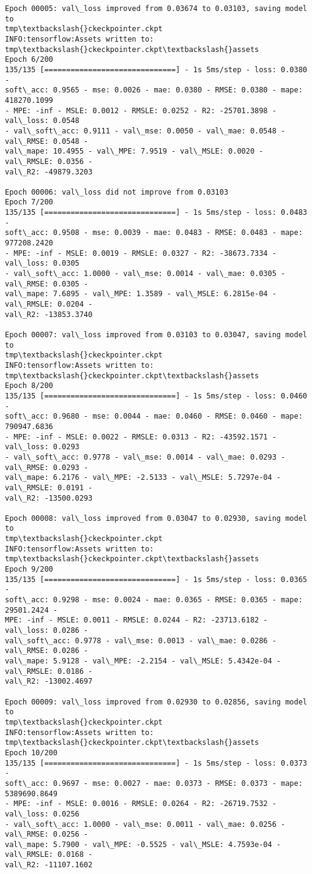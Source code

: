 \documentclass[11pt]{article}
\begin{document}
\begin{Verbatim}[commandchars=\\\{\}]
Epoch 00005: val\_loss improved from 0.03674 to 0.03103, saving model to
tmp\textbackslash{}ckeckpointer.ckpt
INFO:tensorflow:Assets written to: tmp\textbackslash{}ckeckpointer.ckpt\textbackslash{}assets
Epoch 6/200
135/135 [==============================] - 1s 5ms/step - loss: 0.0380 -
soft\_acc: 0.9565 - mse: 0.0026 - mae: 0.0380 - RMSE: 0.0380 - mape: 418270.1099
- MPE: -inf - MSLE: 0.0012 - RMSLE: 0.0252 - R2: -25701.3898 - val\_loss: 0.0548
- val\_soft\_acc: 0.9111 - val\_mse: 0.0050 - val\_mae: 0.0548 - val\_RMSE: 0.0548 -
val\_mape: 10.4955 - val\_MPE: 7.9519 - val\_MSLE: 0.0020 - val\_RMSLE: 0.0356 -
val\_R2: -49879.3203

Epoch 00006: val\_loss did not improve from 0.03103
Epoch 7/200
135/135 [==============================] - 1s 5ms/step - loss: 0.0483 -
soft\_acc: 0.9508 - mse: 0.0039 - mae: 0.0483 - RMSE: 0.0483 - mape: 977208.2420
- MPE: -inf - MSLE: 0.0019 - RMSLE: 0.0327 - R2: -38673.7334 - val\_loss: 0.0305
- val\_soft\_acc: 1.0000 - val\_mse: 0.0014 - val\_mae: 0.0305 - val\_RMSE: 0.0305 -
val\_mape: 7.6895 - val\_MPE: 1.3589 - val\_MSLE: 6.2815e-04 - val\_RMSLE: 0.0204 -
val\_R2: -13853.3740

Epoch 00007: val\_loss improved from 0.03103 to 0.03047, saving model to
tmp\textbackslash{}ckeckpointer.ckpt
INFO:tensorflow:Assets written to: tmp\textbackslash{}ckeckpointer.ckpt\textbackslash{}assets
Epoch 8/200
135/135 [==============================] - 1s 5ms/step - loss: 0.0460 -
soft\_acc: 0.9680 - mse: 0.0044 - mae: 0.0460 - RMSE: 0.0460 - mape: 790947.6836
- MPE: -inf - MSLE: 0.0022 - RMSLE: 0.0313 - R2: -43592.1571 - val\_loss: 0.0293
- val\_soft\_acc: 0.9778 - val\_mse: 0.0014 - val\_mae: 0.0293 - val\_RMSE: 0.0293 -
val\_mape: 6.2176 - val\_MPE: -2.5133 - val\_MSLE: 5.7297e-04 - val\_RMSLE: 0.0191 -
val\_R2: -13500.0293

Epoch 00008: val\_loss improved from 0.03047 to 0.02930, saving model to
tmp\textbackslash{}ckeckpointer.ckpt
INFO:tensorflow:Assets written to: tmp\textbackslash{}ckeckpointer.ckpt\textbackslash{}assets
Epoch 9/200
135/135 [==============================] - 1s 5ms/step - loss: 0.0365 -
soft\_acc: 0.9298 - mse: 0.0024 - mae: 0.0365 - RMSE: 0.0365 - mape: 29501.2424 -
MPE: -inf - MSLE: 0.0011 - RMSLE: 0.0244 - R2: -23713.6182 - val\_loss: 0.0286 -
val\_soft\_acc: 0.9778 - val\_mse: 0.0013 - val\_mae: 0.0286 - val\_RMSE: 0.0286 -
val\_mape: 5.9128 - val\_MPE: -2.2154 - val\_MSLE: 5.4342e-04 - val\_RMSLE: 0.0186 -
val\_R2: -13002.4697

Epoch 00009: val\_loss improved from 0.02930 to 0.02856, saving model to
tmp\textbackslash{}ckeckpointer.ckpt
INFO:tensorflow:Assets written to: tmp\textbackslash{}ckeckpointer.ckpt\textbackslash{}assets
Epoch 10/200
135/135 [==============================] - 1s 5ms/step - loss: 0.0373 -
soft\_acc: 0.9697 - mse: 0.0027 - mae: 0.0373 - RMSE: 0.0373 - mape: 5389690.8649
- MPE: -inf - MSLE: 0.0016 - RMSLE: 0.0264 - R2: -26719.7532 - val\_loss: 0.0256
- val\_soft\_acc: 1.0000 - val\_mse: 0.0011 - val\_mae: 0.0256 - val\_RMSE: 0.0256 -
val\_mape: 5.7900 - val\_MPE: -0.5525 - val\_MSLE: 4.7593e-04 - val\_RMSLE: 0.0168 -
val\_R2: -11107.1602


\end{Verbatim}
\end{document}
